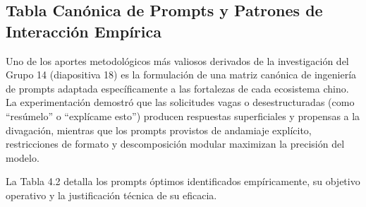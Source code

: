 \subsection{Tabla Canónica de Prompts y Patrones de Interacción Empírica}

Uno de los aportes metodológicos más valiosos derivados de la investigación del Grupo 14 (diapositiva 18) es la formulación de una matriz canónica de ingeniería de prompts adaptada específicamente a las fortalezas de cada ecosistema chino. La experimentación demostró que las solicitudes vagas o desestructuradas (como ``resúmelo'' o ``explícame esto'') producen respuestas superficiales y propensas a la divagación, mientras que los prompts provistos de andamiaje explícito, restricciones de formato y descomposición modular maximizan la precisión del modelo.

La Tabla 4.2 detalla los prompts óptimos identificados empíricamente, su objetivo operativo y la justificación técnica de su eficacia.

